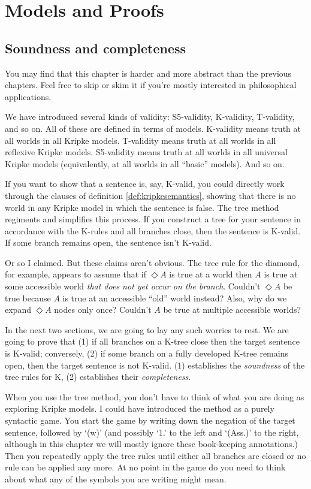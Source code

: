 \chapter{Models and Proofs}\label{ch:proofs}

\section{Soundness and completeness}

You may find that this chapter is harder and more abstract than the previous
chapters. Feel free to skip or skim it if you're mostly interested in
philosophical applications.

We have introduced several kinds of validity: S5-validity, K-validity,
T-validity, and so on. All of these are defined in terms of models. K-validity
means truth at all worlds in all Kripke models. T-validity means truth at all
worlds in all reflexive Kripke models. S5-validity means truth at all worlds in
all universal Kripke models (equivalently, at all worlds in all ``basic''
models). And so on.

If you want to show that a sentence is, say, K-valid, you could directly work
through the clauses of definition \ref{def:kripkesemantics}, showing that there
is no world in any Kripke model in which the sentence is false. The tree method
regiments and simplifies this process. If you construct a tree for your sentence
in accordance with the K-rules and all branches close, then the sentence is
K-valid. If some branch remains open, the sentence isn't K-valid.

Or so I claimed. But these claims aren't obvious. The tree rule for the diamond,
for example, appears to assume that if $\Diamond A$ is true at a world then $A$
is true at some accessible world \emph{that does not yet occur on the branch}.
Couldn't $\Diamond A$ be true because $A$ is true at an accessible ``old'' world
instead? Also, why do we expand $\Diamond A$ nodes only once? Couldn't $A$ be
true at multiple accessible worlds?

In the next two sections, we are going to lay any such worries to rest. We are
going to prove that (1) if all branches on a K-tree close then the target
sentence is K-valid; conversely, (2) if some branch on a fully developed K-tree
remains open, then the target sentence is not K-valid. (1) establishes the
\emph{soundness} of the tree rules for K, (2) establishes their
\emph{completeness}.

When you use the tree method, you don't have to think of what you are doing as
exploring Kripke models. I could have introduced the method as a purely
syntactic game. You start the game by writing down the negation of the target
sentence, followed by `(w)' (and possibly `1.' to the left and `(Ass.)' to the
right, although in this chapter we will mostly ignore these book-keeping
annotations.) Then you repeatedly apply the tree rules until either all branches
are closed or no rule can be applied any more. At no point in the game do you
need to think about what any of the symbols you are writing might mean.

